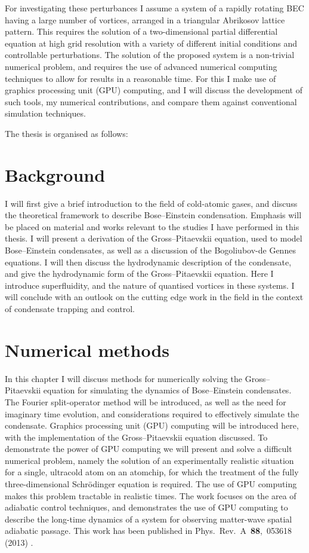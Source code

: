 For investigating these perturbances I assume a system of a rapidly rotating BEC having a large number of vortices, arranged in a triangular Abrikosov lattice pattern. This requires the solution of a two-dimensional partial differential equation at high grid resolution with a variety of different initial conditions and controllable perturbations. The solution of the proposed system is a non-trivial numerical problem, and requires the use of advanced numerical computing techniques to allow for results in a reasonable time. For this I make use of graphics processing unit (GPU) computing, and I will discuss the development of such tools, my numerical contributions, and compare them against conventional simulation techniques.

The thesis is organised as follows:

\section*{Background}
I will first give a brief introduction to the field of cold-atomic gases, and discuss the theoretical framework to describe Bose--Einstein condensation. Emphasis will be placed on material and works relevant to the studies I have performed in this thesis. I will present a derivation of the Gross--Pitaevskii equation, used to model Bose--Einstein condensates, as well as a discussion of the Bogoliubov-de Gennes equations. I will then discuss the hydrodynamic description of the condensate, and give the hydrodynamic form of the Gross--Pitaevskii equation. Here I introduce superfluidity, and the nature of quantised vortices in these systems. I will conclude with an outlook on the cutting edge work in the field in the context of condensate trapping and control.


\section*{Numerical methods}
In this chapter I will discuss methods for numerically solving the Gross--Pitaevskii equation for simulating the dynamics of Bose--Einstein condensates. The Fourier split-operator method will be introduced, as well as the need for imaginary time evolution, and considerations required to effectively simulate the condensate. Graphics processing unit (GPU) computing will be introduced here, with the implementation of the Gross--Pitaevskii equation discussed. To demonstrate the power of GPU computing we will present and solve a difficult numerical problem, namely the solution of an experimentally realistic situation for a single, ultracold atom on an atomchip, for which the treatment of the fully three-dimensional Schr\"odinger equation is required. The use of GPU computing makes this problem tractable in realistic times. The work focuses on the area of adiabatic control techniques, and demonstrates the use of GPU computing to describe the long-time dynamics of a system for observing matter-wave spatial adiabatic passage. This work has been published in  Phys.~Rev.~A~\textbf{88},~053618 (2013) \cite{AO:Morgan_pra_2013}.

